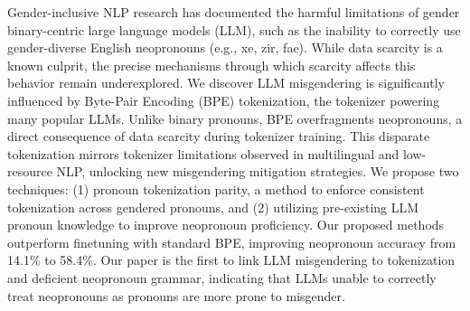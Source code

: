 Gender-inclusive NLP research has documented the harmful limitations of gender binary-centric large language models (LLM), such as the inability to correctly use gender-diverse English neopronouns (e.g., xe, zir, fae). While data scarcity is a known culprit, the precise mechanisms through which scarcity affects this behavior remain underexplored. We discover LLM misgendering is significantly influenced by Byte-Pair Encoding (BPE) tokenization, the tokenizer powering many popular LLMs. Unlike binary pronouns, BPE overfragments neopronouns, a direct consequence of data scarcity during tokenizer training. This disparate tokenization mirrors tokenizer limitations observed in multilingual and low-resource NLP, unlocking new misgendering mitigation strategies. We propose two techniques: (1) pronoun tokenization parity, a method to enforce consistent tokenization across gendered pronouns, and (2) utilizing pre-existing LLM pronoun knowledge to improve neopronoun proficiency. Our proposed methods outperform finetuning with standard BPE, improving neopronoun accuracy from 14.1\% to 58.4\%. Our paper is the first to link LLM misgendering to tokenization and deficient neopronoun grammar, indicating that LLMs unable to correctly treat neopronouns as pronouns are more prone to misgender.